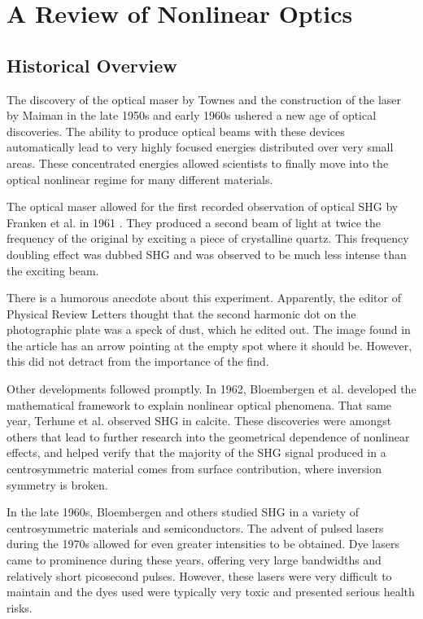 \documentclass[10pt]{article}
\begin{document}
\section{A Review of Nonlinear Optics}
\subsection{Historical Overview}\label{chap_theory_hist}
The discovery of the optical maser by Townes \cite{PhysRev.112.1940} and the construction of the laser by Maiman in the late 1950s and early 1960s ushered a new age of optical discoveries. The ability to produce optical beams with these devices automatically lead to very highly focused energies distributed over very small areas. These concentrated energies allowed scientists to finally move into the optical nonlinear regime for many different materials.

The optical maser allowed for the first recorded observation of optical SHG by Franken et al. in 1961 \cite{PhysRevLett.7.118}. They produced a second beam of light at twice the frequency of the original by exciting a piece of crystalline quartz. This frequency doubling effect was dubbed SHG and was observed to be much less intense than the exciting beam.

There is a humorous anecdote about this experiment. Apparently, the editor of Physical Review Letters thought that the second harmonic dot on the photographic plate was a speck of dust, which he edited out. The image found in the article has an arrow pointing at the empty spot where it should be. However, this did not detract from the importance of the find.

Other developments followed promptly. In 1962, Bloembergen et al. \cite{PhysRev.127.1918, PhysRev.128.606} developed the mathematical framework to explain nonlinear optical phenomena. That same year, Terhune et al. \cite{PhysRevLett.8.404} observed SHG in calcite. These discoveries were amongst others \cite{lax1962nonlinear} that lead to further research into the geometrical dependence of nonlinear effects, and helped verify that the majority of the SHG signal produced in a centrosymmetric material comes from surface contribution, where inversion symmetry is broken.

In the late 1960s, Bloembergen \cite{PhysRev.174.813} and others \cite{PhysRev.178.1218} studied SHG in a variety of centrosymmetric materials and semiconductors. The advent of pulsed lasers during the 1970s \cite{nla.cat-vn2583352} allowed for even greater intensities to be obtained. Dye lasers came to prominence during these years, offering very large bandwidths and relatively short picosecond pulses. However, these lasers were very difficult to maintain and the dyes used were typically very toxic and presented serious health risks.
\end{document}
